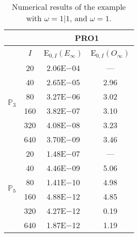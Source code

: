 \begin{table}[H]
\caption{Numerical results of the example with $\omega=1|1$, and $\omega=1$.}
\setlength{\tabcolsep}{5pt}
\centering
\begin{tabular}{@{}l c c c@{}}
\toprule
 &  & \multicolumn{2}{c}{PRO1}\\
\midrule
 & $I$ & E$_{0,I}(E_{\infty})$ & E$_{0,I}(O_{\infty})$\\
\midrule
\multirow{6}{*}{$\mathbb{P}_{3}$}
 & 20 & 2.06E$-$04 & ---\\
 & 40 & 2.65E$-$05 & 2.96\\
 & 80 & 3.27E$-$06 & 3.02\\
 & 160 & 3.82E$-$07 & 3.10\\
 & 320 & 4.08E$-$08 & 3.23\\
 & 640 & 3.70E$-$09 & 3.46\\
\midrule
\multirow{6}{*}{$\mathbb{P}_{5}$}
 & 20 & 1.48E$-$07 & ---\\
 & 40 & 4.46E$-$09 & 5.06\\
 & 80 & 1.41E$-$10 & 4.98\\
 & 160 & 4.88E$-$12 & 4.85\\
 & 320 & 4.27E$-$12 & 0.19\\
 & 640 & 1.87E$-$12 & 1.19\\
\bottomrule
\end{tabular}
\label{Table:PRO:test_01_01_test46_pro1}
\end{table}
